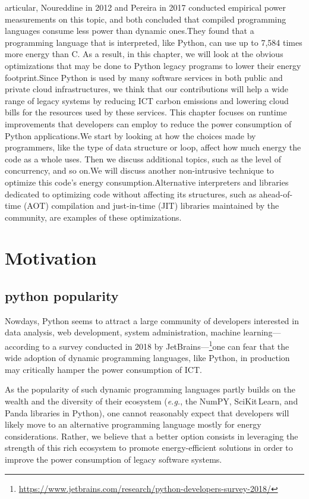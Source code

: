articular, Noureddine in 2012 and Pereira in 2017 conducted empirical power measurements on this topic, and both concluded that compiled programming languages consume less power than dynamic ones.They found that a programming language that is interpreted, like Python, can use up to 7,584 times more energy than C. As a result, in this chapter, we will look at the obvious optimizations that may be done to Python legacy programs to lower their energy footprint.Since Python is used by many software services in both public and private cloud infrastructures, we think that our contributions will help a wide range of legacy systems by reducing ICT carbon emissions and lowering cloud bills for the resources used by these services. This chapter focuses on runtime improvements that developers can employ to reduce the power consumption of Python applications.We start by looking at how the choices made by programmers, like the type of data structure or loop, affect how much energy the code as a whole uses. Then we discuss additional topics, such as the level of concurrency, and so on.We will discuss another non-intrusive technique to optimize this code's energy consumption.Alternative interpreters and libraries dedicated to optimizing code without affecting its structures, such as ahead-of-time (AOT) compilation and just-in-time (JIT) libraries maintained by the community, are examples of these optimizations. 



\section{Motivation}
\subsection{python popularity}

Nowdays, Python seems to attract a large community of developers interested in data analysis, web development, system administration, machine learning---according to a survey conducted in 2018 by JetBrains---\footnote{\url{https://www.jetbrains.com/research/python-developers-survey-2018/}}one can fear that the wide adoption of dynamic programming languages, like Python, in production may critically hamper the power consumption of ICT.

As the popularity of such dynamic programming languages partly builds on the wealth and the diversity of their ecosystem (\emph{e.g.}, the NumPY, SciKit\,Learn, and Panda libraries in Python), one cannot reasonably expect that developers will likely move to an alternative programming language mostly for energy considerations.
Rather, we believe that a better option consists in leveraging the strength of this rich ecosystem to promote energy-efficient solutions in order to improve the power consumption of legacy software systems.




